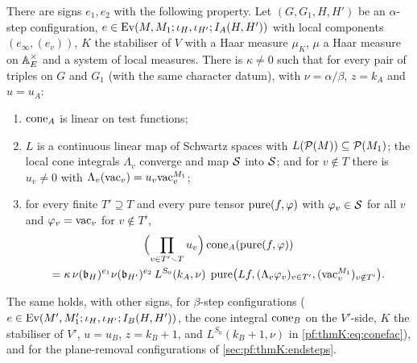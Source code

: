 \begin{proposition}\label{pf:thmK:conefac}
There are signs $e_1,e_2$ with the following property. Let $(G,G_1,H,H')$ be an $\alpha$-step configuration,
$e\in\operatorname{Ev}(M,M_1;\iota_H,\iota_{H'};I_A(H,H'))$ with local components $(e_\infty,(e_v))$, $K$ the stabiliser of $V$ with a
Haar measure $\mu_K$, $\mu$ a Haar measure on $\mathbb{A}_E^\times$ and a system of local measures. There is $\kappa\ne0$ such
that for every pair of triples on $G$ and $G_1$ (with the same character datum), with $\nu=\alpha/\beta$, $z=k_A$ and
$u=u_A$:
\begin{enumerate}
\item $\operatorname{cone}_A$ is linear on test functions;
\item $L$ is a continuous linear map of Schwartz spaces with $L(\mathcal{P}(M))\subseteq\mathcal{P}(M_1)$; the local cone
integrals $\Lambda_v$ converge and map $\mathcal{S}$ into $\mathcal{S}$; and for $v\notin T$ there is $u_v\ne0$ with
$\Lambda_v(\mathrm{vac}_v)=u_v\mathrm{vac}^{M_1}_v$;
\item for every finite $T'\supseteq T$ and every pure tensor $\operatorname{pure}(f,\varphi)$ with $\varphi_v\in\mathcal{S}$ for all $v$
and $\varphi_v=\mathrm{vac}_v$ for $v\notin T'$,
\begin{multline}\label{pf:thmK:eq:conefac}
\Bigl(\prod_{v\in T'\smallsetminus T}u_v\Bigr)\operatorname{cone}_A(\operatorname{pure}(f,\varphi))\\
=\kappa\,\nu(\mathfrak b_H)^{e_1}\nu(\mathfrak b_{H'})^{e_2}\,L^{S_0}(k_A,\nu)\;\operatorname{pure}\bigl(Lf,(\Lambda_v\varphi_v)_{v\in
T'},(\mathrm{vac}^{M_1}_v)_{v\notin T'}\bigr).
\end{multline}
\end{enumerate}
The same holds, with other signs, for $\beta$-step configurations ($e\in\operatorname{Ev}(M',M'_1;\iota_H,\iota_{H'};I_B(H,H'))$,
the cone integral $\operatorname{cone}_B$ on the $V'$-side, $K$ the stabiliser of $V'$, $u=u_B$, $z=k_B+1$, and $L^{S_0}(k_B+1,\nu)$
in \eqref{pf:thmK:eq:conefac}), and for the plane-removal configurations of \cref{sec:pf:thmK:endsteps}.
\end{proposition}

